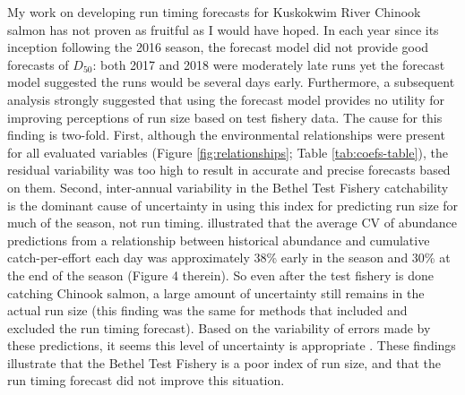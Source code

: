 \documentclass[12pt,]{book}
\theoremstyle{definition}
\theoremstyle{definition}
\theoremstyle{definition}
\theoremstyle{remark}
\begin{document}
\noindent
My work on developing run timing forecasts for Kuskokwim River Chinook
salmon has not proven as fruitful as I would have hoped. In each year
since its inception following the 2016 season, the forecast model did
not provide good forecasts of \(D_{50}\): both 2017 and 2018 were
moderately late runs yet the forecast model suggested the runs would be
several days early. Furthermore, a subsequent analysis
\citep{staton-catalano-2019} strongly suggested that using the forecast
model provides no utility for improving perceptions of run size based on
test fishery data. The cause for this finding is two-fold. First,
although the environmental relationships were present for all evaluated
variables (Figure \ref{fig:relationships}; Table \ref{tab:coefs-table}),
the residual variability was too high to result in accurate and precise
forecasts based on them. Second, inter-annual variability in the Bethel
Test Fishery catchability \citep[i.e., the fraction of total run
captured; the inverse is commonly referred to as
``run-per-index'';][]{flynn-hilborn-2004} is the dominant cause of
uncertainty in using this index for predicting run size for much of the
season, not run timing. \citet{staton-catalano-2019} illustrated that
the average CV of abundance predictions from a relationship between
historical abundance and cumulative catch-per-effort each day was
approximately 38\% early in the season and 30\% at the end of the season
(Figure 4 therein). So even after the test fishery is done catching
Chinook salmon, a large amount of uncertainty still remains in the
actual run size (this finding was the same for methods that included and
excluded the run timing forecast). Based on the variability of errors
made by these predictions, it seems this level of uncertainty is
appropriate \citep[also shown in Figure 4 of][]{staton-catalano-2019}.
These findings illustrate that the Bethel Test Fishery is a poor index
of run size, and that the run timing forecast did not improve this
situation.
\end{document}
